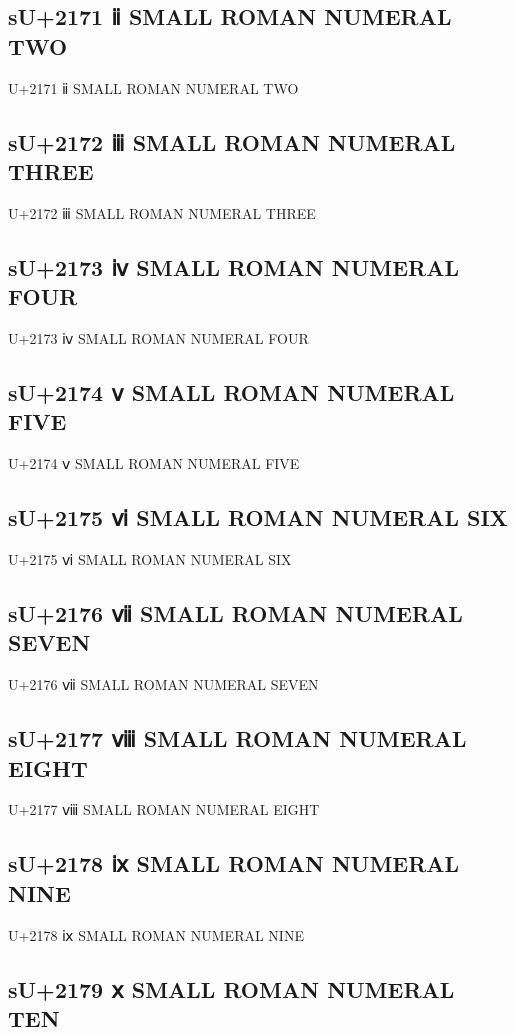\subsection{sU+2171 ⅱ SMALL ROMAN NUMERAL TWO}

U+2171 ⅱ SMALL ROMAN NUMERAL TWO

\subsection{sU+2172 ⅲ SMALL ROMAN NUMERAL THREE}

U+2172 ⅲ SMALL ROMAN NUMERAL THREE

\subsection{sU+2173 ⅳ SMALL ROMAN NUMERAL FOUR}

U+2173 ⅳ SMALL ROMAN NUMERAL FOUR

\subsection{sU+2174 ⅴ SMALL ROMAN NUMERAL FIVE}

U+2174 ⅴ SMALL ROMAN NUMERAL FIVE

\subsection{sU+2175 ⅵ SMALL ROMAN NUMERAL SIX}

U+2175 ⅵ SMALL ROMAN NUMERAL SIX

\subsection{sU+2176 ⅶ SMALL ROMAN NUMERAL SEVEN}

U+2176 ⅶ SMALL ROMAN NUMERAL SEVEN

\subsection{sU+2177 ⅷ SMALL ROMAN NUMERAL EIGHT}

U+2177 ⅷ SMALL ROMAN NUMERAL EIGHT

\subsection{sU+2178 ⅸ SMALL ROMAN NUMERAL NINE}

U+2178 ⅸ SMALL ROMAN NUMERAL NINE

\subsection{sU+2179 ⅹ SMALL ROMAN NUMERAL TEN}

